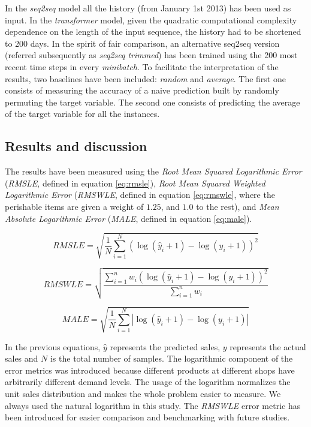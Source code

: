In the \textit{seq2seq} model all the history (from January 1st 2013) has been used as input.  In the \textit{transformer} model, given the quadratic computational complexity dependence on the length of the input sequence, the history had to be shortened to 200 days. In the spirit of fair comparison, an alternative seq2seq version (referred subsequently as \textit{seq2seq trimmed}) has been trained using the 200 most recent time steps in every \textit{minibatch}. To facilitate the interpretation of the results, two baselines have been included: \textit{random} and \textit{average}. The first one consists of measuring the accuracy of a naive prediction built by randomly permuting the target variable. The second one consists of predicting the average of the target variable for all the instances.

\subsection{Results and discussion}

The results have been measured using the \textit{Root Mean Squared Logarithmic Error} (\textit{RMSLE}, defined in equation \ref{eq:rmsle}), \textit{Root Mean Squared Weighted Logarithmic Error} (\textit{RMSWLE}, defined in equation \ref{eq:rmswle}, where the perishable items are given a weight of $1.25$, and $1.0$ to the rest),  and \textit{Mean Absolute Logarithmic Error} (\textit{MALE}, defined in equation \ref{eq:male}).

\begin{equation} \label{eq:rmsle}
RMSLE = \sqrt{ \frac{1}{N} \displaystyle\sum_{i=1}^N  \left(\log(\hat{y}_i + 1) - \log(y_i +1)  \right)^2  }
\end{equation}

\begin{equation} \label{eq:rmswle}
RMSWLE = \sqrt{ \frac{\displaystyle\sum_{i=1}^n w_i \left( \log(\hat{y}_i + 1) - \log(y_i +1)  \right)^2  }{\displaystyle\sum_{i=1}^n w_i}}
\end{equation}

\begin{equation} \label{eq:male}
MALE = \sqrt{ \frac{1}{N} \displaystyle\sum_{i=1}^N  \left|\log(\hat{y}_i + 1) - \log(y_i +1)  \right|  }
\end{equation}


In the previous equations, $\hat{y}$ represents the predicted sales,  $y$ represents the actual sales and $N$ is the total number of samples. The logarithmic component of the error metrics was introduced because different products at different shops have arbitrarily different demand levels. The usage of the logarithm normalizes the unit sales distribution and makes the whole problem easier to measure.  We always used the natural logarithm in this study. The \textit{RMSWLE} error metric has been introduced for easier comparison and benchmarking with future studies.

